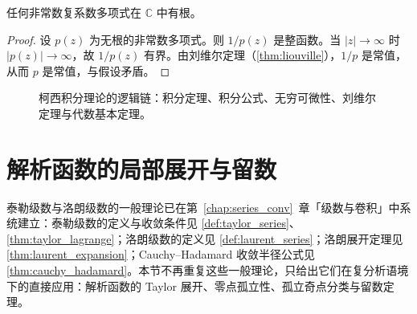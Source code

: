 \begin{corollary}[代数基本定理]\label{cor:fundamental_theorem_algebra}
任何非常数复系数多项式在 $\mathbb{C}$ 中有根。
\end{corollary}

\begin{proof}
设 $p(z)$ 为无根的非常数多项式。则 $1/p(z)$ 是整函数。当 $|z| \to \infty$ 时 $|p(z)| \to \infty$，故 $1/p(z)$ 有界。由刘维尔定理（\cref{thm:liouville}），$1/p$ 是常值，从而 $p$ 是常值，与假设矛盾。
\end{proof}

\begin{figure}[htbp]
\centering
{}
\caption{柯西积分理论的逻辑链：积分定理、积分公式、无穷可微性、刘维尔定理与代数基本定理。}
\label{fig:cauchy_theory_flow}
\end{figure}

\section{解析函数的局部展开与留数}\label{sec:analytic_expansion_residue}

\begin{remark}\label{rem:expansion_series_interface}
泰勒级数与洛朗级数的一般理论已在第~\ref{chap:series_conv}~章「级数与卷积」中系统建立：泰勒级数的定义与收敛条件见 \cref{def:taylor_series}、\cref{thm:taylor_lagrange}；洛朗级数的定义见 \cref{def:laurent_series}；洛朗展开定理见 \cref{thm:laurent_expansion}；Cauchy–Hadamard 收敛半径公式见 \cref{thm:cauchy_hadamard}。本节不再重复这些一般理论，只给出它们在复分析语境下的直接应用：解析函数的 Taylor 展开、零点孤立性、孤立奇点分类与留数定理。
\end{remark}

